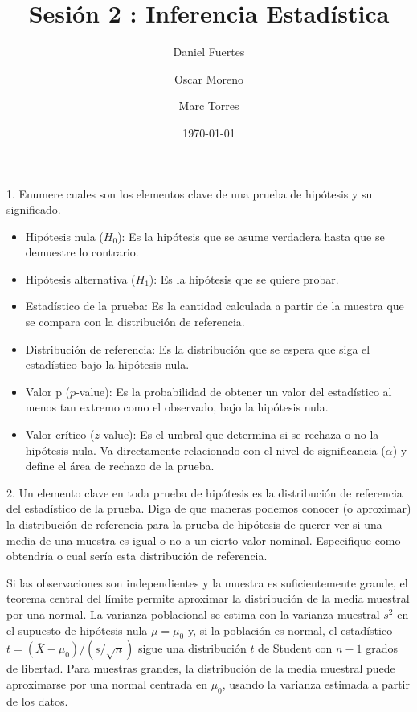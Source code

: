 \documentclass[11pt,a4paper]{article}
\title{Sesión 2 : Inferencia Estadística}
\author{
    Daniel Fuertes\\
    \and
    Oscar Moreno\\
    \and
    Marc Torres\\
}
\date{\today}
\begin{document}
\maketitle

\begin{tcolorbox}[colback=gray!20,colframe=gray!20, sharp corners]
1. Enumere cuales son los elementos clave de una prueba de hipótesis y su significado.
\end{tcolorbox}
\begin{itemize}
    \item Hipótesis nula ($H_0$): Es la hipótesis que se asume verdadera hasta que se demuestre lo contrario.
    \item Hipótesis alternativa ($H_1$): Es la hipótesis que se quiere probar.
    \item Estadístico de la prueba: Es la cantidad calculada a partir de la muestra que se compara con la distribución de referencia.
    \item Distribución de referencia: Es la distribución que se espera que siga el estadístico bajo la hipótesis nula.
    \item Valor p ($p$-value): Es la probabilidad de obtener un valor del estadístico al menos tan extremo como el observado, bajo la hipótesis nula.
    \item Valor crítico ($z$-value): Es el umbral que determina si se rechaza o no la hipótesis nula. Va directamente relacionado con el nivel de significancia ($\alpha$) y define el área de rechazo de la prueba.
\end{itemize}
\begin{tcolorbox}[colback=gray!20,colframe=gray!20, sharp corners]
2. Un elemento clave en toda prueba de hipótesis es la distribución de referencia del estadístico de la prueba. Diga de que maneras podemos conocer (o aproximar) la distribución de referencia para la prueba de hipótesis de querer ver si una media de una muestra
es igual o no a un cierto valor nominal. Especifique como obtendría o cual sería esta distribución de referencia.
\end{tcolorbox}

Si las observaciones son independientes y la muestra es suficientemente grande, el teorema central del límite permite aproximar la distribución de la 
media muestral por una normal. La varianza poblacional se estima con la varianza muestral $s^2$ en el supuesto de hipótesis nula $\mu = \mu_0$ y, si la población es normal, el estadístico $t=(\overline{X}-\mu_0)/(s/\sqrt{n})$ sigue una distribución $t$ de Student con $n-1$ grados de libertad. \newline
Para muestras grandes, la distribución de la media muestral puede aproximarse por una normal centrada en $\mu_0$, usando la varianza estimada a partir de los datos.
\end{document}
